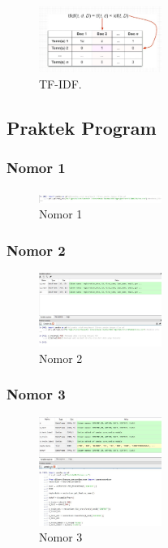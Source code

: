 \begin{figure}[H]
\centering
\includegraphics[width=4cm]{figures/1174074/4/5.jpg}
\caption{TF-IDF.}
\end{figure}

\subsection{Praktek Program}
\subsubsection{Nomor 1}
\hfill\break

\begin{figure}[H]
\centering
\includegraphics[width=4cm]{figures/1174074/4/no1.jpg}
\caption{Nomor 1}
\end{figure}

\subsubsection{Nomor 2}
\hfill\break

\begin{figure}[H]
\centering
\includegraphics[width=4cm]{figures/1174074/4/no2.jpg}
\caption{Nomor 2}
\end{figure}

\subsubsection{Nomor 3}
\hfill\break

\begin{figure}[H]
\centering
\includegraphics[width=4cm]{figures/1174074/4/no3.jpg}
\caption{Nomor 3}
\end{figure}

